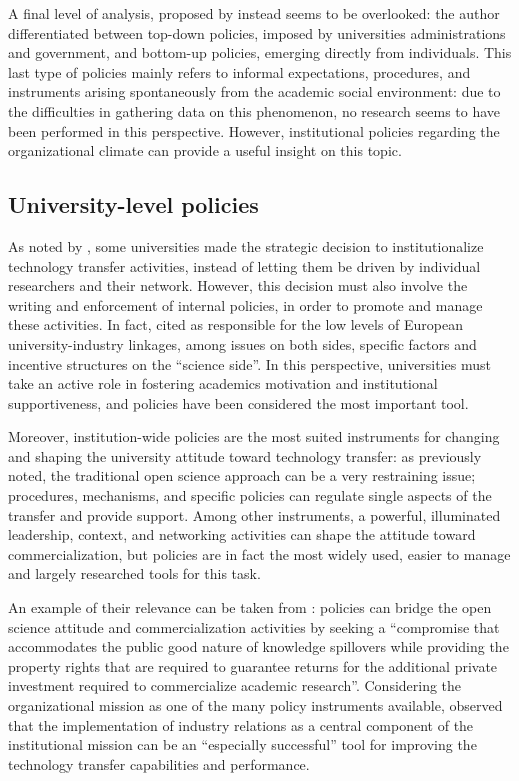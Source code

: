 A final level of analysis, proposed by \citet{Rasmussen2006} instead seems to be overlooked: the author differentiated between top-down policies, imposed by universities administrations and government, and bottom-up policies, emerging directly from individuals. This last type of policies mainly refers to informal expectations, procedures, and instruments arising spontaneously from the academic social environment: due to the difficulties in gathering data on this phenomenon, no research seems to have been performed in this perspective. However, institutional policies regarding the organizational climate can provide a useful insight on this topic.

\subsection{University-level policies}

As noted by \citet{Geuna2009}, some universities made the strategic decision to institutionalize technology transfer activities, instead of letting them be driven by individual researchers and their network. However, this decision must also involve the writing and enforcement of internal policies, in order to promote and manage these activities. In fact, \citet{Debackere2005} cited as responsible for the low levels of European university-industry linkages, among issues on both sides, specific factors and incentive structures on the \enquote{science side}. In this perspective, universities must take an active role in fostering academics motivation and institutional supportiveness, and policies have been considered the most important tool.

Moreover, institution-wide policies are the most suited instruments for changing and shaping the university attitude toward technology transfer: as previously noted, the traditional open science approach can be a very restraining issue; procedures, mechanisms, and specific policies can regulate single aspects of the transfer and  provide support. Among other instruments, a powerful, illuminated leadership, context, and networking activities can shape the attitude toward commercialization, but policies are in fact the most widely used, easier to manage and largely researched tools for this task. 

An example of their relevance can be taken from \citet{Bercovitz2006}: policies can bridge the open science attitude and commercialization activities by seeking a \enquote{compromise that accommodates the public good nature of knowledge spillovers while providing the property rights that are required to guarantee returns for the additional private investment required to commercialize academic research}.  Considering the organizational mission as one of the many policy instruments available, \citet{Debackere2005} observed that the implementation of industry relations as a central component of the institutional mission can be an \enquote{especially successful} tool for improving the technology transfer capabilities and performance. 

